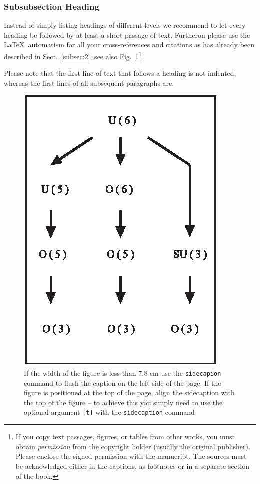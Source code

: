 \documentclass[graybox,envcountchap,sectrefs]{svmono}
\begin{document}
\subsubsection{Subsubsection Heading}
Instead of simply listing headings of different levels we recommend to let every heading be followed by at least a short passage of text. Furtheron please use the \LaTeX\ automatism for all your cross-references and citations as has already been described in Sect.~\ref{subsec:2}, see also Fig.~\ref{fig:1}\footnote{If you copy text passages, figures, or tables from other works, you must obtain \textit{permission} from the copyright holder (usually the original publisher). Please enclose the signed permission with the manucript. The sources must be acknowledged either in the captions, as footnotes or in a separate section of the book.}

Please note that the first line of text that follows a heading is not indented, whereas the first lines of all subsequent paragraphs are.

%
\begin{figure}[b]
	\sidecaption
	\includegraphics[scale=.65]{img/figure}
	\caption{If the width of the figure is less than 7.8 cm use the \texttt{sidecapion} command to flush the caption on the left side of the page. If the figure is positioned at the top of the page, align the sidecaption with the top of the figure -- to achieve this you simply need to use the optional argument \texttt{[t]} with the \texttt{sidecaption} command}
	\label{fig:1}       %
\end{figure}
\end{document}
